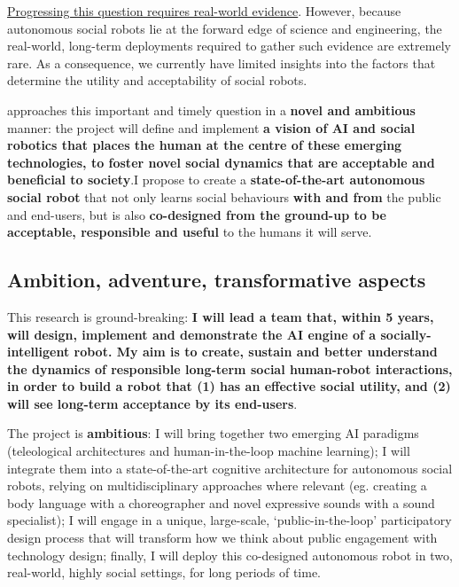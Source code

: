 \ul{Progressing this question requires real-world evidence}. However, because
autonomous social robots lie at the forward edge of science and engineering, the
real-world, long-term deployments required to gather such evidence are extremely
rare. As a consequence, we currently have limited insights into the factors that
determine the utility and acceptability of social robots.

\project approaches this important and timely question in a \textbf{novel and
ambitious} manner: the project will define and implement \textbf{a vision of AI
and social robotics that places the human at the centre of these emerging
technologies, to foster novel social dynamics that are acceptable and beneficial
to society}.I propose to create a \textbf{state-of-the-art autonomous social
robot} that not only learns social behaviours \textbf{with and from} the public
and end-users, but is also \textbf{co-designed from the ground-up to be
acceptable, responsible and useful} to the humans it will serve.





\subsection{Ambition, adventure, transformative aspects}

This research is ground-breaking: \textbf{I will lead a team that, within 5
years, will design, implement and demonstrate the AI engine of a
socially-intelligent robot.  My aim is to create, sustain and better understand
the dynamics of responsible long-term social human-robot interactions, in order
to build a robot that (1) has an effective social utility, and (2) will see
long-term acceptance by its end-users}.


The \project project is \textbf{ambitious}: I will bring together two emerging AI
paradigms (teleological architectures and human-in-the-loop machine learning); I
will integrate them into a state-of-the-art cognitive architecture for
autonomous social robots, relying on multidisciplinary approaches where relevant
(eg. creating a body language with a choreographer and novel expressive sounds
with a sound specialist); I will engage in a unique, large-scale,
`public-in-the-loop' participatory design process that will transform how we
think about public engagement with technology design; finally, I will deploy this
co-designed autonomous robot in two, real-world, highly social settings, for long
periods of time.

